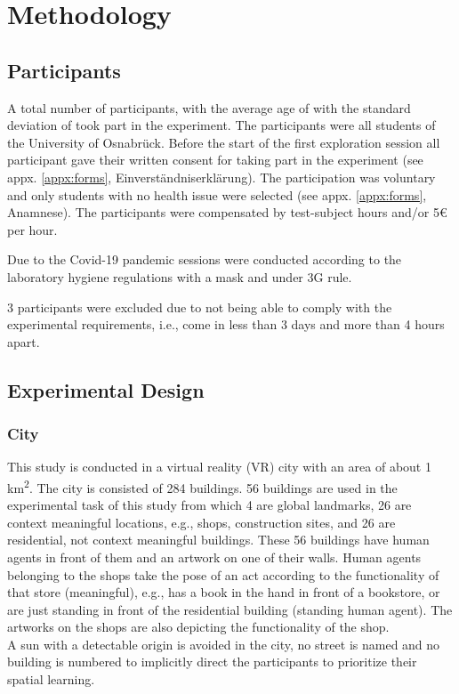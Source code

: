 \chapter{Methodology}

\section{Participants}

A total number of  participants,  with the average age of  with the standard deviation of  took part in the experiment. The participants were all students of the University of Osnabrück. Before the start of the first exploration session all participant gave their written consent for taking part in the experiment (see appx. \ref{appx:forms}, Einverständniserklärung). The participation was voluntary and only students with no health issue were selected (see appx. \ref{appx:forms}, Anamnese). The participants were compensated by test-subject hours and/or 5€ per hour.  

Due to the Covid-19 pandemic sessions were conducted according to the laboratory hygiene regulations with a mask and under 3G rule.

3 participants were excluded due to not being able to comply with the experimental requirements, i.e., come in less than 3 days and more than 4 hours apart.



\section{Experimental Design}

\subsection{City}

This study is conducted in a virtual reality (VR) city with an area of about 1 km\textsuperscript2. The city is consisted of 284 buildings. 56 buildings are used in the experimental task of this study from which 4 are global landmarks, 26 are {\emphasize context meaningful} locations, e.g., shops, construction sites, and 26 are residential, {\emphasize not context meaningful} buildings. These 56 buildings have human agents in front of them and an artwork on one of their walls. Human agents belonging to the shops take the pose of an act according to the functionality of that store {\emphasize(meaningful)}, e.g., has a book in the hand in front of a bookstore, or are just standing in front of the residential building {\emphasize(standing human agent)}. The artworks on the shops are also depicting the functionality of the shop.\\
A sun with a detectable origin is avoided in the city, no street is named and no building is numbered to implicitly direct the participants to prioritize their spatial learning. 

